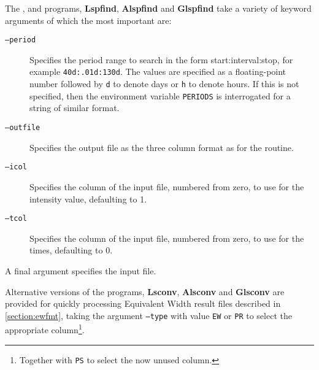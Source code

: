 The {\scipy}, {\astroml} and {\gatspy} programs, \textbf{Lspfind}, \textbf{Alspfind} and \textbf{Glspfind} take a
variety of keyword arguments of which the most important are:

\begin{description}

\item[\tt{--period}] Specifies the period range to search in the form start:interval:stop, for example
  \texttt{40d:.01d:130d}. The values are specified as a floating-point number followed by \texttt{d} to denote days or \texttt{h} to
  denote hours. If this is not specified, then the environment variable \texttt{PERIODS} is interrogated for a string of
  similar format.

\item[\tt{--outfile}] Specifies the output file as the three column format as for the {\numrecs} routine.

\item[\tt{--icol}] Specifies the column of the input file, numbered from zero, to use for the intensity value, defaulting to
  1.

\item[\tt{--tcol}] Specifies the column of the input file, numbered from zero, to use for the times, defaulting to 0.

\end{description}

A final argument specifies the input file.

Alternative versions of the programs, \textbf{Lsconv}, \textbf{Alsconv} and \textbf{Glsconv} are provided for quickly
processing Equivalent Width result files described in \ref{section:ewfmt}, taking the argument \texttt{--type} with value \texttt{EW} or \texttt{PR} to
select the appropriate column\footnote{Together with \texttt{PS} to select the now unused column.}.
